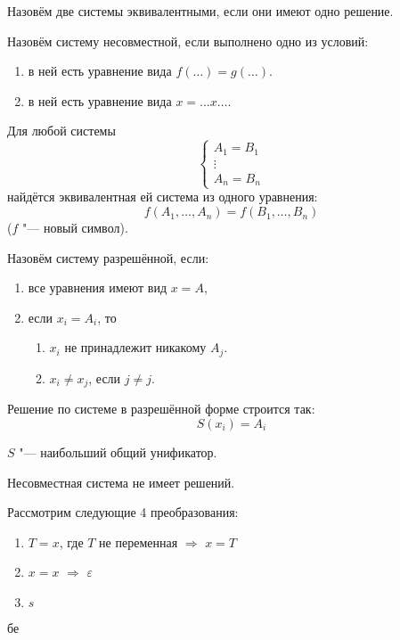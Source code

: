 \begin{definition}
    Назовём две системы эквивалентными, если они имеют одно решение.
\end{definition}

\begin{definition}
    Назовём систему несовместной, если выполнено одно из условий:
    \begin{enumerate}
        \item в ней есть уравнение вида $f(\ldots)=g(\ldots)$.
        \item в ней есть уравнение вида $x = \ldots x \ldots$.
    \end{enumerate}
\end{definition}

\begin{statement}
    Для любой системы
    \[
        \begin{cases} A_1 = B_1 \\ \vdots \\ A_n = B_n \end{cases}
    \]
    найдётся эквивалентная ей система из одного уравнения:
    \[
        f(A_1, \ldots, A_n) = f(B_1, \ldots, B_n)
    \]
    ($f$ "--- новый символ).
\end{statement}

\begin{definition}
    Назовём систему разрешённой, если:
    \begin{enumerate}
        \item все уравнения имеют вид $x = A$,
        \item если $x_i = A_i$, то
        \begin{enumerate}[label=(\alph*)]
            \item $x_i$ не принадлежит никакому $A_j$.
            \item $x_i \neq x_j$, если $j \neq j$.
        \end{enumerate}
    \end{enumerate}
\end{definition}

Решение по системе в разрешённой форме строится так:
\[
    S(x_i)=A_i
\]
\todo

\begin{statement}
    $S$ "--- наибольший общий унификатор.
\end{statement}

\begin{statement}
    Несовместная система не имеет решений.
\end{statement}

Рассмотрим следующие 4 преобразования:
\begin{enumerate}[label=(\alph*)]
    \item $T=x$, где $T$ не переменная $\Rightarrow$ $x=T$
    \item $x=x$ $\Rightarrow$ $\varepsilon$
    \item $s$
\end{enumerate}

бе
